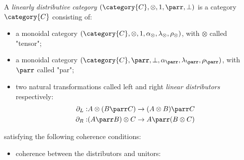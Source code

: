 \documentclass[DIN, pagenumber=false, fontsize=11pt, parskip=half, colorinlistoftodos, svgnames]{scrartcl}
\begin{document}
	\begin{definition}
		\label{def: linDisCat}
		A \emph{linearly} \emph{distributive} \emph{category} $(\category{C}, \otimes, 1, \parr, \bot)$ is a category $\category{C}$ consisting of:
		\begin{itemize}
			\item a monoidal category $(\category{C}, \otimes, 1, \alpha_\otimes, \lambda_\otimes, \rho_\otimes)$, with $\otimes$ called "tensor";
			\item a monoidal  category $(\category{C}, \parr, \bot, \alpha_\parr, \lambda_\parr, \rho_\parr)$, with $\parr$ called "par";
			\item two natural transformations called left and right \emph{linear distributors} respectively:
			\begin{align*}
				\partial_L:& A \otimes (B \parr C) \rightarrow (A\otimes B) \parr C
				\\
				\partial_R:& (A \parr B) \otimes C \rightarrow A \parr (B \otimes C)
			\end{align*}
		\end{itemize}
		satisfying the following coherence conditions:
		\begin{itemize}
			\item coherence between the distributors and unitors:
			\begin{center}
				

\end{center}
\end{itemize}
\end{definition}
\end{document}
